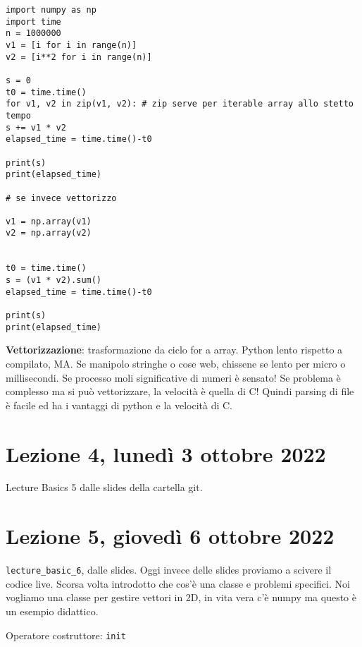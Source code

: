\documentclass[10pt, a4paper, titlepage]{book}
\begin{document}
\begin{verbatim}
import numpy as np
import time
n = 1000000
v1 = [i for i in range(n)]
v2 = [i**2 for i in range(n)]

s = 0
t0 = time.time()
for v1, v2 in zip(v1, v2): # zip serve per iterable array allo stetto tempo
s += v1 * v2
elapsed_time = time.time()-t0

print(s)
print(elapsed_time)

# se invece vettorizzo

v1 = np.array(v1)
v2 = np.array(v2)


t0 = time.time()
s = (v1 * v2).sum()
elapsed_time = time.time()-t0

print(s)
print(elapsed_time)
\end{verbatim}

\textbf{Vettorizzazione}: trasformazione da ciclo for a array. Python lento rispetto a compilato, MA. Se manipolo stringhe o cose web, chissene se lento per micro o millisecondi. Se processo moli significative di numeri è sensato!
Se problema è complesso ma si può vettorizzare, la velocità è quella di C! Quindi parsing di file è facile ed ha i vantaggi di python e la velocità di C.


\section{Lezione 4, lunedì 3 ottobre 2022}

Lecture Basics 5 dalle slides della cartella git.


\section{Lezione 5, giovedì 6 ottobre 2022}

\texttt{lecture\_basic\_6}, dalle slides.
Oggi invece delle slides proviamo a scivere il codice live.
Scorsa volta introdotto che cos'è una classe e problemi specifici.
Noi vogliamo una classe per gestire vettori in 2D, in vita vera c'è numpy ma questo è un esempio didattico.

Operatore costruttore: \texttt{init} 
\end{document}

